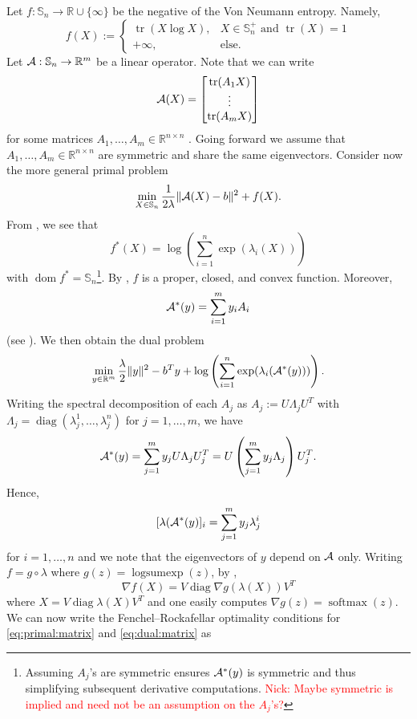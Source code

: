 \documentclass[10pt,a4paper]{article}
\numberwithin{equation}{section}
\theoremstyle{definition}
\def\rr{{\mathbb R}}
\def\cA{{\cal A}}
\def\Sym{{\mathbb S}}
\DeclareMathOperator{\logsumexp}{logsumexp}
\DeclareMathOperator{\diag}{diag}
\DeclareMathOperator{\softmax}{softmax}
\DeclareMathOperator{\tr}{tr}
\DeclareMathOperator{\dom}{dom}
\begin{document}
Let $f: \mathbb{S}_n \to \rr \cup \{ \infty \}$ be the negative of the Von Neumann entropy. Namely,
\[
f(X) := \begin{cases}
			\tr(X \log X), & X \in \Sym _n^+ \text{ and } \tr(X) = 1 \\
            + \infty, & \text{else}.
		 \end{cases}
\]
Let $\cA: \mathbb{S}_n \to \rr^m$ be a linear operator. Note that 
we can write
\[
\cA(X) = \begin{bmatrix}
    \tr(A_1 X) \\
    \vdots \\
    \tr(A_m X) \\
\end{bmatrix}
\]
for some matrices $A_1, \dots, A_m \in \rr^{n \times n}$ \cite[\S{1.10}]{firstorderBeck}. Going forward we assume that $A_1, \dots, A_m \in \rr^{n \times n}$ are symmetric and share the same eigenvectors. Consider now the more general primal problem 
\begin{equation}\label{eq:primal:matrix}
 \min_{X \in \Sym_n} \frac{1}{2 \lambda} \lVert \cA(X) - b \rVert^2 + f(X).
\end{equation}
From \cite[Example 7.16]{firstorderBeck}, we see that 
\[
f^\ast(X) = \log \left(\sum_{i=1}^n \exp(\lambda_i(X))\right)
\]
with 
$\dom f^\ast = \Sym_n$\footnote{Assuming $A_j$'s are symmetric ensures $\cA^\ast(y)$ is symmetric and thus simplifying subsequent derivative computations. \textcolor{red}{Nick: Maybe symmetric is implied and need not be an assumption on the $A_j$'s?}}. By \cite[Corollary 5.2.3]{NonLin_COnvOpt}, $f$ is a proper, closed, and convex function. Moreover,
\[
\cA^\ast(y) = \sum_{i=1}^m y_i A_i
\]
(see \cite[\S{1.10}]{firstorderBeck}). We then obtain the dual problem
\begin{equation}\label{eq:dual:matrix}
    \min_{y \in \rr^m} \frac{\lambda}{2} \lVert y \rVert^2 - b^Ty +  \log \left(\sum_{i=1}^n \exp(\lambda_i(\cA^\ast(y)))\right).
\end{equation}
Writing the spectral decomposition of each $A_j$ as $A_j := U \Lambda_j U^T$ with $\Lambda_j = \diag(\lambda_j^1, \dots, \lambda_j^n)$ for $j=1, \dots, m$, we have
\[
\cA^\ast(y) = \sum_{j=1}^m y_j U \Lambda_j U_j^T = U \left( \sum_{j=1}^m y_j \Lambda_j \right) U_j^T.
\]
Hence, \begin{equation}\label{eq:eigvals_A*y}
[\lambda(\cA^\ast(y)]_i = \sum_{j=1}^m y_j \lambda_j^i
\end{equation}
for $i = 1, \dots, n$ and we note that the eigenvectors of $y$ depend on $\cA$ only. Writing $f = g \circ \lambda$ where $g(z) = \logsumexp(z)$, by \cite[Corollary 5.2.5]{NonLin_COnvOpt}, 
\[
\nabla f(X) = V \diag \nabla g(\lambda(X))V^T
\]
where $X = V \diag \lambda(X) V^T$ and one easily computes $\nabla g(z) = \softmax(z)$. We can now write the Fenchel--Rockafellar optimality conditions for \ref{eq:primal:matrix} and \ref{eq:dual:matrix} as 
\end{document}
